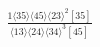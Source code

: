 \documentclass[varwidth, border=5pt]{standalone}
\begin{document}
\begin{my}
$\begin{gathered}
\scriptscriptstyle\frac{1⟨35⟩⟨45⟩⟨23⟩^2[35]}{⟨13⟩⟨24⟩⟨34⟩^3[45]}
\end{gathered}$
\end{my}
\end{document}
